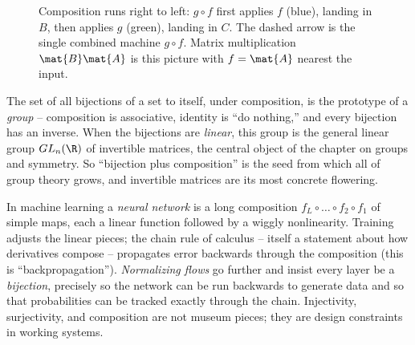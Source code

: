 \begin{figure}[H]
\centering
{}
\caption{Composition runs right to left: $g\circ f$ first applies $f$ (blue), landing in
$B$, then applies $g$ (green), landing in $C$. The dashed arrow is the single combined
machine $g\circ f$. Matrix multiplication $\mat{B}\mat{A}$ is this picture with $f=\mat{A}$
nearest the input.}
\label{ch38:composition}
\end{figure}

\begin{connectionbox}
The set of all bijections of a set to itself, under composition, is the prototype of a
\emph{group} -- composition is associative, identity is ``do nothing,'' and every
bijection has an inverse. When the bijections are \emph{linear}, this group is the general
linear group $GL_n(\R)$ of invertible matrices, the central object of the chapter on
groups and symmetry. So ``bijection plus composition'' is the seed from which all of group
theory grows, and invertible matrices are its most concrete flowering.
\end{connectionbox}

\begin{applicationbox}
In machine learning a \emph{neural network} is a long composition $f_L \circ \dots \circ
f_2 \circ f_1$ of simple maps, each a linear function followed by a wiggly nonlinearity.
Training adjusts the linear pieces; the chain rule of calculus -- itself a statement about
how derivatives compose -- propagates error backwards through the composition (this is
``backpropagation''). \emph{Normalizing flows} go further and insist every layer be a
\emph{bijection}, precisely so the network can be run backwards to generate data and so
that probabilities can be tracked exactly through the chain. Injectivity, surjectivity,
and composition are not museum pieces; they are design constraints in working systems.
\end{applicationbox}

